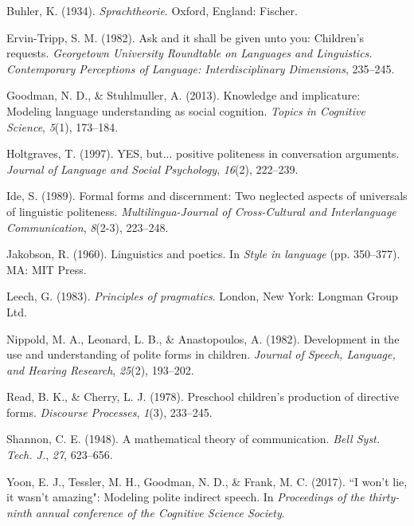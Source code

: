 \documentclass[10pt, letterpaper]{article}
\begin{document}
\hypertarget{ref-buhler1934}{}
Buhler, K. (1934). \emph{Sprachtheorie}. Oxford, England: Fischer.

\hypertarget{ref-ervin1982}{}
Ervin-Tripp, S. M. (1982). Ask and it shall be given unto you:
Children's requests. \emph{Georgetown University Roundtable on Languages
and Linguistics. Contemporary Perceptions of Language: Interdisciplinary
Dimensions}, 235--245.

\hypertarget{ref-goodman2013}{}
Goodman, N. D., \& Stuhlmuller, A. (2013). Knowledge and implicature:
Modeling language understanding as social cognition. \emph{Topics in
Cognitive Science}, \emph{5}(1), 173--184.

\hypertarget{ref-holtgraves1997}{}
Holtgraves, T. (1997). YES, but... positive politeness in conversation
arguments. \emph{Journal of Language and Social Psychology},
\emph{16}(2), 222--239.

\hypertarget{ref-ide1989}{}
Ide, S. (1989). Formal forms and discernment: Two neglected aspects of
universals of linguistic politeness. \emph{Multilingua-Journal of
Cross-Cultural and Interlanguage Communication}, \emph{8}(2-3),
223--248.

\hypertarget{ref-jakobson1960}{}
Jakobson, R. (1960). Linguistics and poetics. In \emph{Style in
language} (pp. 350--377). MA: MIT Press.

\hypertarget{ref-leech1983}{}
Leech, G. (1983). \emph{Principles of pragmatics}. London, New York:
Longman Group Ltd.

\hypertarget{ref-nippold1982}{}
Nippold, M. A., Leonard, L. B., \& Anastopoulos, A. (1982). Development
in the use and understanding of polite forms in children. \emph{Journal
of Speech, Language, and Hearing Research}, \emph{25}(2), 193--202.

\hypertarget{ref-read1978}{}
Read, B. K., \& Cherry, L. J. (1978). Preschool children's production of
directive forms. \emph{Discourse Processes}, \emph{1}(3), 233--245.

\hypertarget{ref-shannon1948}{}
Shannon, C. E. (1948). A mathematical theory of communication.
\emph{Bell Syst. Tech. J.}, \emph{27}, 623--656.

\hypertarget{ref-yoon2017}{}
Yoon, E. J., Tessler, M. H., Goodman, N. D., \& Frank, M. C. (2017). ``I
won't lie, it wasn't amazing": Modeling polite indirect speech. In
\emph{Proceedings of the thirty-ninth annual conference of the Cognitive
Science Society}.
\end{document}
